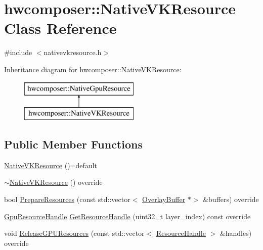 \hypertarget{classhwcomposer_1_1NativeVKResource}{}\section{hwcomposer\+:\+:Native\+V\+K\+Resource Class Reference}
\label{classhwcomposer_1_1NativeVKResource}


{\ttfamily \#include $<$nativevkresource.\+h$>$}

Inheritance diagram for hwcomposer\+:\+:Native\+V\+K\+Resource\+:\begin{figure}[H]
\begin{center}
\leavevmode
\includegraphics[height=2.000000cm]{classhwcomposer_1_1NativeVKResource}
\end{center}
\end{figure}
\subsection*{Public Member Functions}
\begin{DoxyCompactItemize}
\item 
\mbox{\hyperlink{classhwcomposer_1_1NativeVKResource_a4b76979a95e1793c1d27438b888f90bb}{Native\+V\+K\+Resource}} ()=default
\item 
\mbox{\hyperlink{classhwcomposer_1_1NativeVKResource_a6efaba2eae08e44208dd3828b79dc7b6}{$\sim$\+Native\+V\+K\+Resource}} () override
\item 
bool \mbox{\hyperlink{classhwcomposer_1_1NativeVKResource_a0ec0dd54f25a32da5645d8e40e1ecf4f}{Prepare\+Resources}} (const std\+::vector$<$ \mbox{\hyperlink{classhwcomposer_1_1OverlayBuffer}{Overlay\+Buffer}} $\ast$$>$ \&buffers) override
\item 
\mbox{\hyperlink{namespacehwcomposer_a3da411c7c0213da2ce847c654bdc180d}{Gpu\+Resource\+Handle}} \mbox{\hyperlink{classhwcomposer_1_1NativeVKResource_a3402b7cdd51d36e65d5ccfa123e7224b}{Get\+Resource\+Handle}} (uint32\+\_\+t layer\+\_\+index) const override
\item 
void \mbox{\hyperlink{classhwcomposer_1_1NativeVKResource_aa8d7578f30f33d2dd932e8c598e70474}{Release\+G\+P\+U\+Resources}} (const std\+::vector$<$ \mbox{\hyperlink{namespacehwcomposer_a963c5a1d5902d2d05710dba19af35b48}{Resource\+Handle}} $>$ \&handles) override
\end{DoxyCompactItemize}


